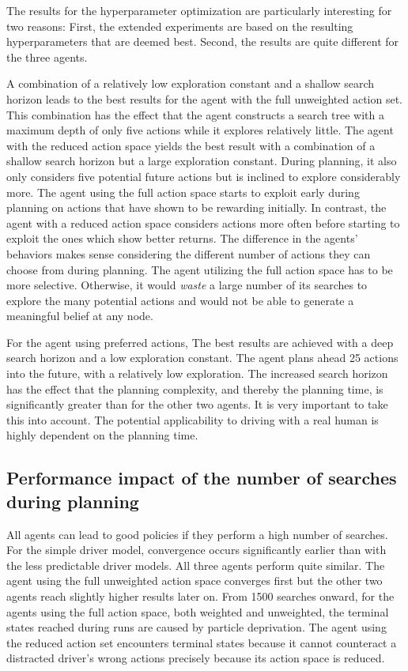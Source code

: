 The results for the hyperparameter optimization are particularly interesting for two reasons: First, the extended experiments are based on the resulting hyperparameters that are deemed best. Second, the results are quite different for the three agents. 

A combination of a relatively low exploration constant and a shallow search horizon leads to the best results for the agent with the full unweighted action set. This combination has the effect that the agent constructs a search tree with a maximum depth of only five actions while it explores relatively little. The agent with the reduced action space yields the best result with a combination of a shallow search horizon but a large exploration constant. During planning, it also only considers five potential future actions but is inclined to explore considerably more. The agent using the full action space starts to exploit early during planning on actions that have shown to be rewarding initially. In contrast, the agent with a reduced action space considers actions more often before starting to exploit the ones which show better returns. The difference in the agents' behaviors makes sense considering the different number of actions they can choose from during planning. The agent utilizing the full action space has to be more selective. Otherwise, it would \emph{waste} a large number of its searches to explore the many potential actions and would not be able to generate a meaningful belief at any node.

For the agent using preferred actions, The best results are achieved with a deep search horizon and a low exploration constant. The agent plans ahead 25 actions into the future, with a relatively low exploration. The increased search horizon has the effect that the planning complexity, and thereby the planning time, is significantly greater than for the other two agents. It is very important to take this into account. The potential applicability to driving with a real human is highly dependent on the planning time.

\subsection{Performance impact of the number of searches during planning}

All agents can lead to good policies if they perform a high number of searches. For the simple driver model, convergence occurs significantly earlier than with the less predictable driver models. All three agents perform quite similar. The agent using the full unweighted action space converges first but the other two agents reach slightly higher results later on. From 1500 searches onward, for the agents using the full action space, both weighted and unweighted, the terminal states reached during runs are caused by particle deprivation. The agent using the reduced action set encounters terminal states because it cannot counteract a distracted driver's wrong actions precisely because its action space is reduced.

